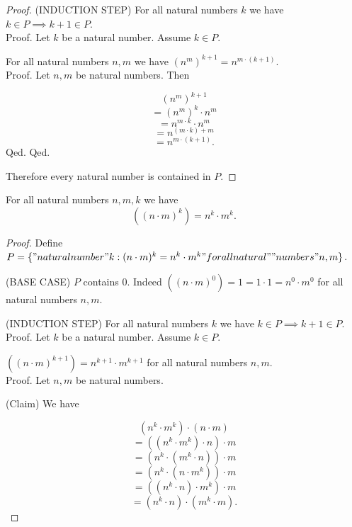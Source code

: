 \documentclass[../../natural-numbers.ftl.tex]{subfiles}
\begin{document}
\begin{forthel}
\begin{proof}
      (INDUCTION STEP) For all natural numbers $k$ we have $k \in P \implies k + 1 \in P$. \\
      Proof.
        Let $k$ be a natural number.
        Assume $k \in P$.

        For all natural numbers $n,m$ we have $(n^{m})^{k + 1} =
        n^{m \cdot (k + 1)}$. \\
        Proof.
          Let $n,m$ be natural numbers.
          Then

          $$  (n^{m})^{k + 1}$$
          $$= (n^{m})^{k} \cdot n^{m}$$   %
          $$= n^{m \cdot k} \cdot n^{m}$$ %
          $$= n^{(m \cdot k) + m}$$       %
          $$= n^{m \cdot (k + 1)}.$$      %
        Qed.
      Qed.

      Therefore every natural number is contained in $P$.
    \end{proof}


    \begin{proposition}[NN 01 04 644237]
      For all natural numbers $n,m,k$ we have
      $$((n \cdot m)^{k}) = n^{k} \cdot m^{k}.$$
    \end{proposition}
    \begin{proof}
      Define $P = \{ "natural number" k : (n \cdot m)^{k} = n^{k} \cdot m^{k} "for all natural"\\"numbers" n,m \}$.

      (BASE CASE) $P$ contains $0$.
      Indeed $((n \cdot m)^{0}) = 1 = 1 \cdot 1 = n^{0} \cdot m^{0}$ for all natural numbers $n,m$.

      (INDUCTION STEP) For all natural numbers $k$ we have $k \in P \implies k + 1 \in P$. \\
      Proof.
        Let $k$ be a natural number.
        Assume $k \in P$.

        $((n \cdot m)^{k + 1}) = n^{k + 1} \cdot m^{k + 1}$ for all natural numbers $n,m$. \\
        Proof.
          Let $n,m$ be natural numbers.

          (Claim) We have

          $$  (n^{k} \cdot m^{k}) \cdot (n \cdot m)$$
          $$= ((n^{k} \cdot m^{k}) \cdot n) \cdot m$$  %
          $$= (n^{k} \cdot (m^{k} \cdot n)) \cdot m$$  %
          $$= (n^{k} \cdot (n \cdot m^{k})) \cdot m$$  %
          $$= ((n^{k} \cdot n) \cdot m^{k}) \cdot m$$  %
          $$= (n^{k} \cdot n) \cdot (m^{k} \cdot m).$$ %


\end{proof}
\end{forthel}
\end{document}
